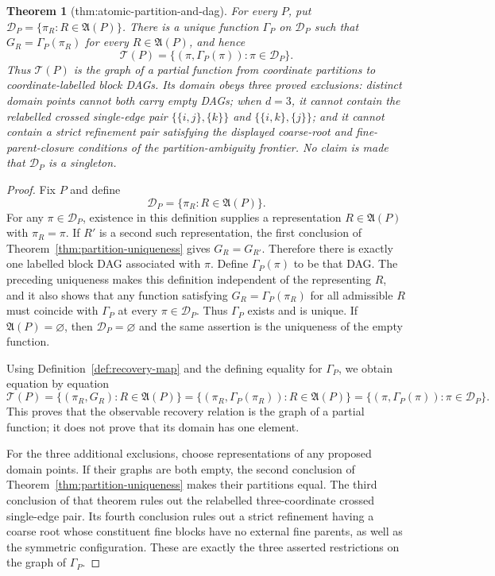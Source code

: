 \documentclass{article}
\newtheorem{theorem}{Theorem}
\begin{document}
\begin{theorem}[thm:atomic-partition-and-dag]\label{thm:atomic-partition-and-dag}
For every \(P\), put \(\mathcal D_P=\{\pi_R:R\in\mathfrak A(P)\}\). There is a unique function \(\Gamma_P\) on \(\mathcal D_P\) such that \(G_R=\Gamma_P(\pi_R)\) for every \(R\in\mathfrak A(P)\), and hence \[\mathcal T(P)=\{(\pi,\Gamma_P(\pi)):\pi\in\mathcal D_P\}.\] Thus \(\mathcal T(P)\) is the graph of a partial function from coordinate partitions to coordinate-labelled block DAGs. Its domain obeys three proved exclusions: distinct domain points cannot both carry empty DAGs; when \(d=3\), it cannot contain the relabelled crossed single-edge pair \(\{\{i,j\},\{k\}\}\) and \(\{\{i,k\},\{j\}\}\); and it cannot contain a strict refinement pair satisfying the displayed coarse-root and fine-parent-closure conditions of the partition-ambiguity frontier. No claim is made that \(\mathcal D_P\) is a singleton.
\end{theorem}
\begin{proof}
Fix \(P\) and define
\[
 \mathcal D_P=\{\pi_R:R\in\mathfrak A(P)\}.
\]
For any \(\pi\in\mathcal D_P\), existence in this definition supplies a
representation \(R\in\mathfrak A(P)\) with \(\pi_R=\pi\).  If \(R'\) is a
second such representation, the first conclusion of
Theorem~\ref{thm:partition-uniqueness} gives \(G_R=G_{R'}\).  Therefore there
is exactly one labelled block DAG associated with \(\pi\).  Define
\(\Gamma_P(\pi)\) to be that DAG.  The preceding uniqueness makes this
definition independent of the representing \(R\), and it also shows that any
function satisfying \(G_R=\Gamma_P(\pi_R)\) for all admissible \(R\) must
coincide with \(\Gamma_P\) at every \(\pi\in\mathcal D_P\).  Thus
\(\Gamma_P\) exists and is unique.  If \(\mathfrak A(P)=\varnothing\), then
\(\mathcal D_P=\varnothing\) and the same assertion is the uniqueness of the
empty function.

Using Definition~\ref{def:recovery-map} and the defining equality for
\(\Gamma_P\), we obtain equation by equation
\[
 \mathcal T(P)
 =\{(\pi_R,G_R):R\in\mathfrak A(P)\}
 =\{(\pi_R,\Gamma_P(\pi_R)):R\in\mathfrak A(P)\}
 =\{(\pi,\Gamma_P(\pi)):\pi\in\mathcal D_P\}.
\]
This proves that the observable recovery relation is the graph of a partial
function; it does not prove that its domain has one element.

For the three additional exclusions, choose representations of any proposed
domain points.  If their graphs are both empty, the second conclusion of
Theorem~\ref{thm:partition-uniqueness} makes their partitions equal.  The
third conclusion of that theorem rules out the relabelled three-coordinate
crossed single-edge pair.  Its fourth conclusion rules out a strict refinement
having a coarse root whose constituent fine blocks have no external fine
parents, as well as the symmetric configuration.  These are exactly the three
asserted restrictions on the graph of \(\Gamma_P\).
\end{proof}
\end{document}
